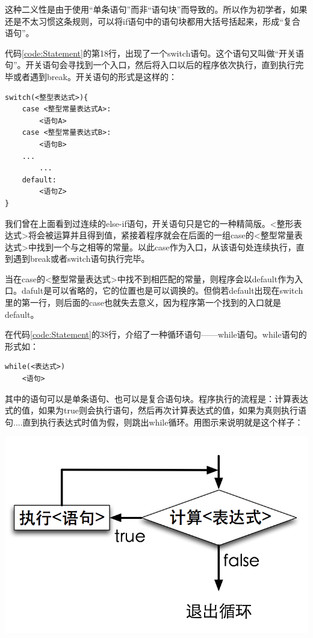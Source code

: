 这种二义性是由于使用“单条语句”而非“语句块”而导致的。所以作为初学者，如果还是不太习惯这条规则，可以将if语句中的语句块都用大括号括起来，形成“复合语句”。

代码\ref{code:Statement}的第18行，出现了一个switch语句。这个语句又叫做“开关语句”。开关语句会寻找到一个入口，然后将入口以后的程序依次执行，直到执行完毕或者遇到break。开关语句的形式是这样的：

\begin{lstlisting}[xleftmargin=10em,xrightmargin=10em]
switch(<整型表达式>){
    case <整型常量表达式A>:
        <语句A>
    case <整型常量表达式B>:
        <语句B>
    ...
        ...
    default:
        <语句Z>
}
\end{lstlisting}

我们曾在上面看到过连续的else-if语句，开关语句只是它的一种精简版。<整形表达式>将会被运算并且得到值，紧接着程序就会在后面的一组case的<整型常量表达式>中找到一个与之相等的常量。以此case作为入口，从该语句处连续执行，直到遇到break或者switch语句执行完毕。

当在case的<整型常量表达式>中找不到相匹配的常量，则程序会以default作为入口。dafult是可以省略的，它的位置也是可以调换的。但倘若default出现在switch里的第一行，则后面的case也就失去意义，因为程序第一个找到的入口就是default。

在代码\ref{code:Statement}的38行，介绍了一种循环语句——while语句。while语句的形式如：
\begin{lstlisting}[xleftmargin=10em,xrightmargin=10em]
while(<表达式>)
    <语句>
\end{lstlisting}

其中的语句可以是单条语句、也可以是复合语句块。程序执行的流程是：计算表达式的值，如果为true则会执行语句，然后再次计算表达式的值，如果为真则执行语句....直到执行表达式时值为假，则跳出while循环。用图示来说明就是这个样子：

\begin{center}
\includegraphics{fig/1-6/2_while_statement.png}
\end{center}

